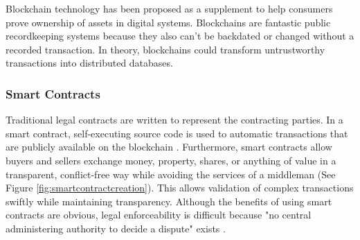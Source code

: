 	Blockchain technology has been proposed as a supplement to help consumers prove ownership of assets in digital systems.  Blockchains are fantastic public recordkeeping systems because they also can’t be backdated or changed without a recorded transaction. In theory, blockchains could transform untrustworthy transactions into distributed databases.
	
	
	
	
		 


\subsubsection{Smart Contracts}
		Traditional legal contracts are written to represent the contracting parties. In a smart contract, self-executing source code is used to automatic transactions that are publicly available on the blockchain \cite{ethereumWhitePaper:Online}.
		Furthermore, smart contracts allow buyers and sellers exchange money, property, shares, or anything of value in a transparent, conflict-free way while avoiding the services of a middleman (See Figure \ref{fig:smartcontractcreation}). This allows validation of complex transactions swiftly while maintaining transparency. Although the benefits of using smart contracts are obvious, legal enforceability is difficult because "no central administering authority to decide a dispute" exists \cite{keyfindings:Online}. 


